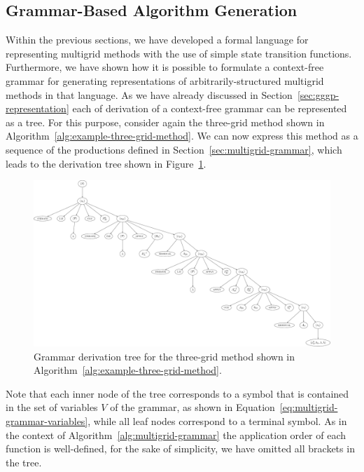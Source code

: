 \subsection{Grammar-Based Algorithm Generation}
Within the previous sections, we have developed a formal language for representing multigrid methods with the use of simple state transition functions.
Furthermore, we have shown how it is possible to formulate a context-free grammar for generating representations of arbitrarily-structured multigrid methods in that language.
As we have already discussed in Section~\ref{sec:gggp-representation} each of derivation of a context-free grammar can be represented as a tree.
For this purpose, consider again the three-grid method shown in Algorithm~\ref{alg:example-three-grid-method}.
We can now express this method as a sequence of the productions defined in Section~\ref{sec:multigrid-grammar}, which leads to the derivation tree shown in Figure~\ref{fig:example-three-grid-method-derivation-tree}.
\begin{figure}
	\centering
	\includegraphics[width=\textwidth]{figures/trees/three_grid_method_grammar_tree.pdf}
	\caption{Grammar derivation tree for the three-grid method shown in Algorithm~\ref{alg:example-three-grid-method}.}
	\label{fig:example-three-grid-method-derivation-tree}
\end{figure}
Note that each inner node of the tree corresponds to a symbol that is contained in the set of variables $V$ of the grammar, as shown in Equation~\eqref{eq:multigrid-grammar-variables}, while all leaf nodes correspond to a terminal symbol.
As in the context of Algorithm~\ref{alg:multigrid-grammar} the application order of each function is well-defined, for the sake of simplicity, we have omitted all brackets in the tree.
